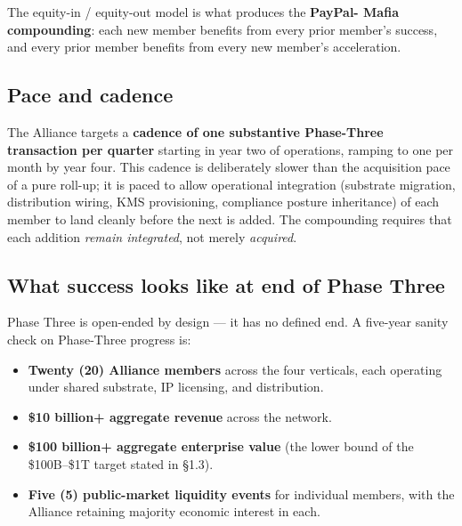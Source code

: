 The equity-in / equity-out model is what produces the \textbf{PayPal-
Mafia compounding}: each new member benefits from every prior member's
success, and every prior member benefits from every new member's
acceleration.

\subsection{Pace and cadence}

The Alliance targets a \textbf{cadence of one substantive Phase-Three
transaction per quarter} starting in year two of operations, ramping to
one per month by year four. This cadence is deliberately slower than the
acquisition pace of a pure roll-up; it is paced to allow operational
integration (substrate migration, distribution wiring, KMS provisioning,
compliance posture inheritance) of each member to land cleanly before
the next is added. The compounding requires that each addition
\emph{remain integrated}, not merely \emph{acquired}.

\subsection{What success looks like at end of Phase Three}

Phase Three is open-ended by design --- it has no defined end. A
five-year sanity check on Phase-Three progress is:

\begin{itemize}[leftmargin=2em,itemsep=0.1em]
\item \textbf{Twenty (20) Alliance members} across the four verticals,
each operating under shared substrate, IP licensing, and distribution.
\item \textbf{\$10 billion+ aggregate revenue} across the network.
\item \textbf{\$100 billion+ aggregate enterprise value} (the lower
bound of the \$100B--\$1T target stated in \S 1.3).
\item \textbf{Five (5) public-market liquidity events} for individual
members, with the Alliance retaining majority economic interest in each.
\end{itemize}
